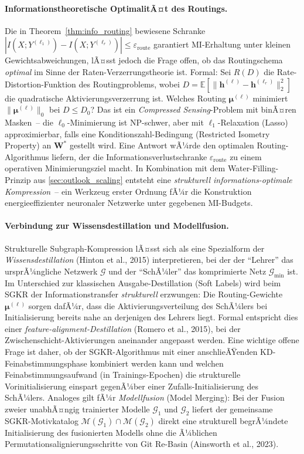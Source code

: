 ﻿\documentclass[12pt, a4paper, openany]{report}
\newcommand{\E}{\mathbb{E}}
\newcommand{\calG}{\mathcal{G}}
\newcommand{\calM}{\mathcal{M}}
\begin{document}
\paragraph{Informationstheoretische OptimalitÃ¤t des Routings.}
Die in Theorem~\ref{thm:info_routing} bewiesene Schranke
$|I(X;Y^{(\ell_1)}) - I(X;Y^{(\ell_r)})| \leq \varepsilon_{\mathrm{route}}$
garantiert MI-Erhaltung unter kleinen Gewichtsabweichungen, lÃ¤sst jedoch
die Frage offen, ob das Routingschema \emph{optimal} im Sinne der
Raten-Verzerrungstheorie ist.  Formal: Sei $R(D)$ die Rate-Distortion-Funktion
des Routingproblems, wobei
$D = \E[\|\bm{h}^{(\ell)} - \bm{h}^{(\ell_r)}\|_2^2]$
die quadratische Aktivierungsverzerrung ist.  Welches Routing $\bm{\mu}^{(\ell)}$
minimiert $\|\bm{\mu}^{(\ell)}\|_0$ bei $D \leq D_0$?  Das ist ein
\emph{Compressed Sensing}-Problem mit binÃ¤ren Masken~-- die $\ell_0$-Minimierung
ist NP-schwer, aber mit $\ell_1$-Relaxation (Lasso) approximierbar, falls
eine Konditionszahl-Bedingung (Restricted Isometry Property) an $\bm{W}^*$
gestellt wird.  Eine Antwort wÃ¼rde den optimalen Routing-Algorithmus liefern,
der die Informationsverlustschranke $\varepsilon_{\mathrm{route}}$ zu einem
operativen Minimierungsziel macht.  In Kombination mit dem
Water-Filling-Prinzip aus \cref{sec:outlook_scaling} entsteht eine
\emph{strukturell informations-optimale Kompression}~-- ein Werkzeug erster
Ordnung fÃ¼r die Konstruktion energieeffizienter neuronaler Netzwerke unter
gegebenen MI-Budgets.

\paragraph{Verbindung zur Wissensdestillation und Modellfusion.}
Strukturelle Subgraph-Kompression lÃ¤sst sich als eine Spezialform der
\emph{Wissensdestillation} (Hinton et al., 2015) interpretieren, bei der
der ``Lehrer'' das ursprÃ¼ngliche Netzwerk $\calG$ und der ``SchÃ¼ler'' das
komprimierte Netz $\calG_{\min}$ ist.  Im Unterschied zur klassischen
Ausgabe-Destillation (Soft Labels) wird beim SGKR der Informationstransfer
\emph{strukturell} erzwungen: Die Routing-Gewichte $\bm{\mu}^{(\ell)}$
sorgen dafÃ¼r, dass die Aktivierungsverteilung des SchÃ¼lers bei Initialisierung
bereits nahe an derjenigen des Lehrers liegt.  Formal entspricht dies einer
\emph{feature-alignment-Destillation} (Romero et al., 2015), bei der
Zwischenschicht-Aktivierungen aneinander angepasst werden.  Eine wichtige
offene Frage ist daher, ob der SGKR-Algorithmus mit einer anschlieÃŸenden
KD-Feinabstimmungsphase kombiniert werden kann und welchen Feinabstimmungs\-aufwand
(in Trainings-Epochen) die strukturelle Vorinitialisierung einspart gegenÃ¼ber
einer Zufalls-Initialisierung des SchÃ¼lers.  Analoges gilt fÃ¼r
\emph{Modellfusion} (Model Merging): Bei der Fusion zweier unabhÃ¤ngig
trainierter Modelle $\calG_1$ und $\calG_2$ liefert der gemeinsame
SGKR-Motivkatalog $\calM(\calG_1) \cap \calM(\calG_2)$ direkt eine
strukturell begrÃ¼ndete Initialisierung des fusionierten Modells ohne die
Ã¼blichen Permutationsalignierungsschritte von Git Re-Basin (Ainsworth
et al., 2023).
\end{document}
